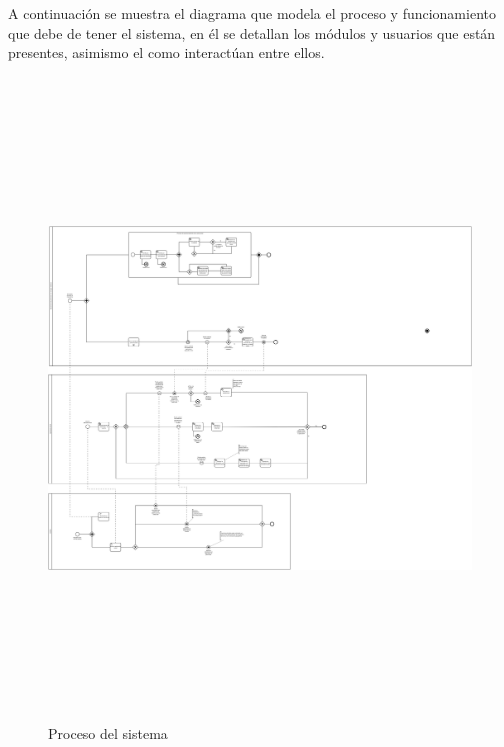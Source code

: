 A continuación se muestra el diagrama que modela el proceso y funcionamiento que debe de tener el sistema, en él se detallan los módulos y usuarios que están presentes, asimismo el como interactúan entre ellos.

\begin{figure}[H]
\centering
\includegraphics[width=23cm, height=17cm, angle=90]{./images/analisis/proceso.png}
\caption{Proceso del sistema}
\label{fig:1-1-1}
\end{figure}





